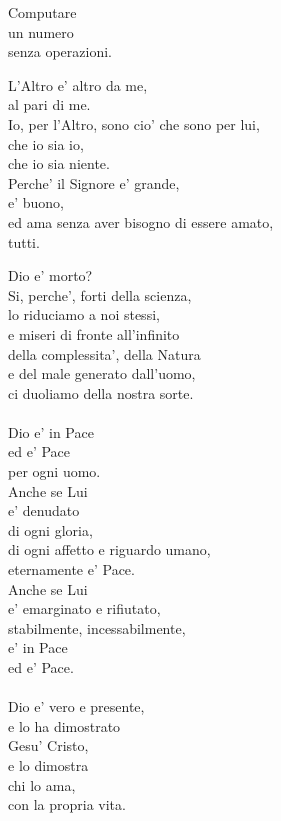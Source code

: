 \begin{haiku}
    Computare\\
    un numero\\
    senza operazioni.\\
\end{haiku}

\begin{haiku}
    L'Altro e' altro da me,\\
    al pari di me.\\
    Io, per l'Altro, sono cio' che sono per lui,\\
    che io sia io,\\
    che io sia niente.\\
    Perche' il Signore e' grande,\\
    e' buono,\\
    ed ama senza aver bisogno di essere amato,\\
    tutti.\\
\end{haiku}

\begin{haiku}
    Dio e' morto?\\
    Si, perche', forti della scienza,\\
    lo riduciamo a noi stessi,\\
    e miseri di fronte all'infinito\\
    della complessita', della Natura\\
    e del male generato dall'uomo,\\
    ci duoliamo della nostra sorte.\\
    \leavevmode\\
    Dio e' in Pace\\
    ed e' Pace\\
    per ogni uomo.\\
    Anche se Lui\\
    e' denudato\\
    di ogni gloria,\\
    di ogni affetto e riguardo umano,\\
    eternamente e' Pace.\\
    Anche se Lui\\
    e' emarginato e rifiutato,\\
    stabilmente, incessabilmente,\\
    e' in Pace\\
    ed e' Pace.\\
    \leavevmode\\
    Dio e' vero e presente,\\
    e lo ha dimostrato\\
    Gesu' Cristo,\\
    e lo dimostra\\
    chi lo ama,\\
    con la propria vita.\\
\end{haiku}

